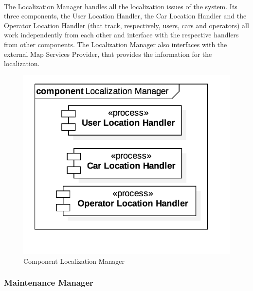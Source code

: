		\paragraph{} The Localization Manager handles all the localization issues of the system. Its three components, the User Location Handler, the Car Location Handler and the Operator Location Handler (that track, respectively, users, cars and operators) all work independently from each other and interface with the respective handlers from other components. The Localization Manager also interfaces with the external Map Services Provider, that provides the information for the localization.
		\begin{figure}[h]
			\includegraphics[scale=0.4, center]{img/component_diagrams/05_localization_manager.png}
			\caption{Component Localization Manager}
		\end{figure}	
\FloatBarrier		
		
		
		\subsubsection*{Maintenance Manager}
		
		
